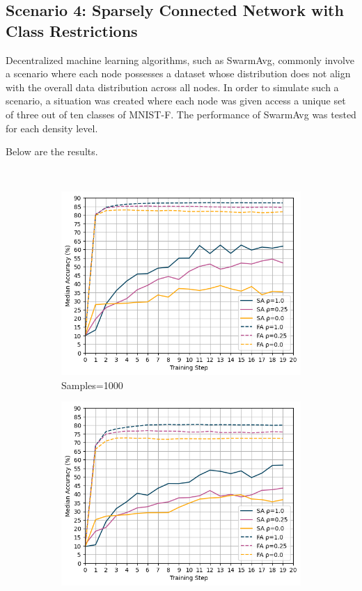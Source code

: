 \documentclass[letterpaper, 10 pt, conference]{ieeeconf}  %
\begin{document}
\subsection{Scenario 4: Sparsely Connected Network with Class Restrictions}
Decentralized machine learning algorithms, such as SwarmAvg, commonly involve a scenario where each node possesses a dataset whose distribution does not align with the overall data distribution across all nodes. In order to simulate such a scenario, a situation was created where each node was given access a unique set of three out of ten classes of MNIST-F. The performance of SwarmAvg was tested for each density level.

Below are the results.
\begin{figure}[H] 
	 \\
	\begin{subfigure}{0.49\textwidth}
		\includegraphics[width=\textwidth]{conf_sparse_ns1000_cl3}
		\caption{Samples=1000}
	\end{subfigure}
	\begin{subfigure}{0.49\textwidth}
		\includegraphics[width=\textwidth]{conf_sparse_ns100_cl3}

\end{subfigure}
\end{figure}
\end{document}
